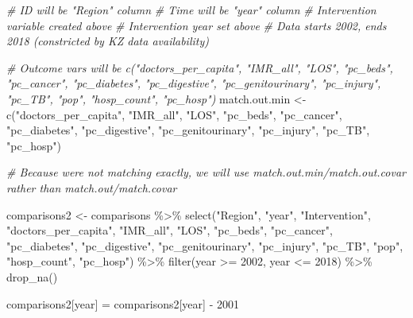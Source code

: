 \documentclass[
]{article}
\newenvironment{Shaded}{\begin{snugshade}}{\end{snugshade}}
\newcommand{\CommentTok}[1]{\textcolor[rgb]{0.56,0.35,0.01}{\textit{#1}}}
\newcommand{\DecValTok}[1]{\textcolor[rgb]{0.00,0.00,0.81}{#1}}
\newcommand{\FunctionTok}[1]{\textcolor[rgb]{0.00,0.00,0.00}{#1}}
\newcommand{\NormalTok}[1]{#1}
\newcommand{\OtherTok}[1]{\textcolor[rgb]{0.56,0.35,0.01}{#1}}
\newcommand{\SpecialCharTok}[1]{\textcolor[rgb]{0.00,0.00,0.00}{#1}}
\newcommand{\StringTok}[1]{\textcolor[rgb]{0.31,0.60,0.02}{#1}}
\begin{document}
\begin{Shaded}
\begin{Highlighting}[]
\CommentTok{\# ID will be "Region" column}
\CommentTok{\# Time will be "year" column}
\CommentTok{\# Intervention variable created above}
\CommentTok{\# Intervention year set above}
\CommentTok{\# Data starts 2002, ends 2018 (constricted by KZ data availability)}

\CommentTok{\# Outcome vars will be c("doctors\_per\_capita", "IMR\_all", "LOS", "pc\_beds", "pc\_cancer", "pc\_diabetes", "pc\_digestive", "pc\_genitourinary", "pc\_injury", "pc\_TB", "pop", "hosp\_count", "pc\_hosp")}
\NormalTok{match.out.min }\OtherTok{\textless{}{-}} \FunctionTok{c}\NormalTok{(}\StringTok{"doctors\_per\_capita"}\NormalTok{, }\StringTok{"IMR\_all"}\NormalTok{, }\StringTok{"LOS"}\NormalTok{, }\StringTok{"pc\_beds"}\NormalTok{, }
                   \StringTok{"pc\_cancer"}\NormalTok{, }\StringTok{"pc\_diabetes"}\NormalTok{, }\StringTok{"pc\_digestive"}\NormalTok{, }
                   \StringTok{"pc\_genitourinary"}\NormalTok{, }\StringTok{"pc\_injury"}\NormalTok{, }\StringTok{"pc\_TB"}\NormalTok{, }\StringTok{"pc\_hosp"}\NormalTok{)}

\CommentTok{\# Because we\textquotesingle{}re not matching exactly, we will use match.out.min/match.out.covar rather than match.out/match.covar}

\NormalTok{comparisons2 }\OtherTok{\textless{}{-}}\NormalTok{ comparisons }\SpecialCharTok{\%\textgreater{}\%}
  \FunctionTok{select}\NormalTok{(}\StringTok{"Region"}\NormalTok{, }\StringTok{"year"}\NormalTok{, }\StringTok{"Intervention"}\NormalTok{, }\StringTok{"doctors\_per\_capita"}\NormalTok{, }\StringTok{"IMR\_all"}\NormalTok{, }
         \StringTok{"LOS"}\NormalTok{, }\StringTok{"pc\_beds"}\NormalTok{, }\StringTok{"pc\_cancer"}\NormalTok{, }\StringTok{"pc\_diabetes"}\NormalTok{, }\StringTok{"pc\_digestive"}\NormalTok{, }
         \StringTok{"pc\_genitourinary"}\NormalTok{, }\StringTok{"pc\_injury"}\NormalTok{, }\StringTok{"pc\_TB"}\NormalTok{, }\StringTok{"pop"}\NormalTok{, }\StringTok{"hosp\_count"}\NormalTok{, }
         \StringTok{"pc\_hosp"}\NormalTok{) }\SpecialCharTok{\%\textgreater{}\%}
  \FunctionTok{filter}\NormalTok{(year }\SpecialCharTok{\textgreater{}=} \DecValTok{2002}\NormalTok{, year }\SpecialCharTok{\textless{}=} \DecValTok{2018}\NormalTok{) }\SpecialCharTok{\%\textgreater{}\%}
  \FunctionTok{drop\_na}\NormalTok{()}

\NormalTok{comparisons2[}\StringTok{\textquotesingle{}year\textquotesingle{}}\NormalTok{] }\OtherTok{=}\NormalTok{ comparisons2[}\StringTok{\textquotesingle{}year\textquotesingle{}}\NormalTok{] }\SpecialCharTok{{-}} \DecValTok{2001}


\end{Highlighting}
\end{Shaded}
\end{document}
